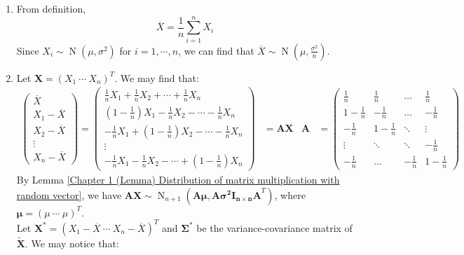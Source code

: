 \documentclass{huhtakm-template-book-v2}
\DeclareMathOperator{\N}{N}
\begin{document}
\begin{proofing}
	\begin{enumerate}
		\item From definition,
		\begin{equation*}
			\overline{X}=\frac{1}{n}\sum_{i=1}^{n}X_{i}
		\end{equation*}
		Since $X_{i}\sim\N(\mu,\sigma^{2})$ for $i=1,\cdots,n$, we can find that $\overline{X}\sim\N(\mu,\frac{\sigma^{2}}{n})$.
		\item Let $\mathbf{X}=(X_{1}\ \cdots\ X_{n})^{T}$. We may find that:
		\begin{align*}
			\begin{pmatrix}
				\overline{X}\\ X_{1}-\overline{X}\\ X_{2}-\overline{X}\\ \vdots\\ X_{n}-\overline{X}
			\end{pmatrix}=\begin{pmatrix}
				\frac{1}{n}X_{1}+\frac{1}{n}X_{2}+\cdots+\frac{1}{n}X_{n}\\
				\left(1-\frac{1}{n}\right)X_{1}-\frac{1}{n}X_{2}-\cdots-\frac{1}{n}X_{n}\\
				-\frac{1}{n}X_{1}+\left(1-\frac{1}{n}\right)X_{2}-\cdots-\frac{1}{n}X_{n}\\
				\vdots\\
				-\frac{1}{n}X_{1}-\frac{1}{n}X_{2}-\cdots+\left(1-\frac{1}{n}\right)X_{n}
			\end{pmatrix}&=\mathbf{AX} & \mathbf{A}&=\begin{pmatrix}
				\frac{1}{n} & \frac{1}{n} & \hdots & \frac{1}{n}\\
				1-\frac{1}{n} & -\frac{1}{n} & \hdots & -\frac{1}{n}\\
				-\frac{1}{n} & 1-\frac{1}{n} & \ddots & \vdots\\
				\vdots & \ddots & \ddots & -\frac{1}{n}\\
				-\frac{1}{n} & \hdots & -\frac{1}{n} & 1-\frac{1}{n}
			\end{pmatrix}
		\end{align*}
		By Lemma \ref{Chapter 1 (Lemma) Distribution of matrix multiplication with random vector}, we have $\mathbf{AX}\sim\N_{n+1}(\mathbf{A}\boldsymbol{\mu},\mathbf{A\sigma^{2}I_{n\times n}A}^{T})$, where $\boldsymbol{\mu}=(\mu\ \cdots\ \mu)^{T}$.\\
		Let $\mathbf{X^{*}}=(X_{1}-\overline{X}\ \cdots\ X_{n}-\overline{X})^{T}$ and $\mathbf{\Sigma^{*}}$ be the variance-covariance matrix of $\mathbf{\widetilde{X}}$. We may notice that:

\end{enumerate}
\end{proofing}
\end{document}
